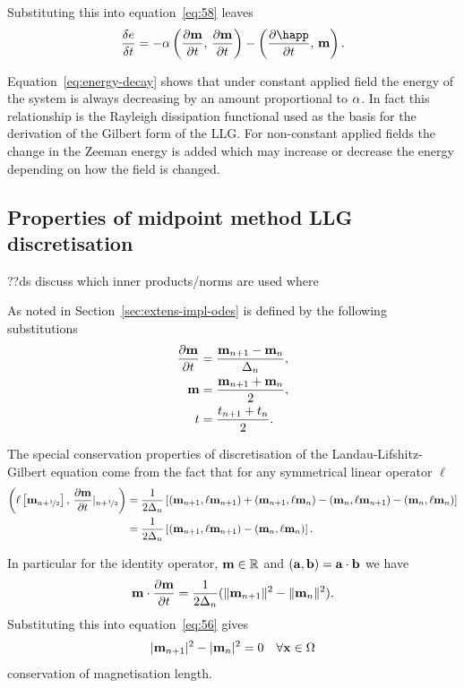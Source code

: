 Substituting this into equation~\eqref{eq:58} leaves
\begin{equation}
  \label{eq:energy-decay}
  \vd{\e}{t} = -\dampc \ip{\dmdt}{\dmdt} - \ip{\pd{\happ}{t}}{\mv}.
\end{equation}

Equation~\eqref{eq:energy-decay} shows that under constant applied field the energy of the system is always decreasing by an amount proportional to $\alpha$.
In fact this relationship is the Rayleigh dissipation functional used as the basis for the derivation of the Gilbert form of the LLG.\cite{Gilbert2004}
For non-constant applied fields the change in the Zeeman energy is added which may increase or decrease the energy depending on how the field is changed. %


\subsection{Properties of midpoint method LLG discretisation}
\label{sec:prop-midp-meth}

??ds discuss which inner products/norms are used where

As noted in Section~\ref{sec:extens-impl-odes} \imr is defined by the following substitutions
\begin{align}
  \label{eq:55}
  \frac{\partial \mathbf{m}}{\partial t} &= \frac{\mathbf{m}_{n+1} - \mathbf{m}_n}{\Delta_{n}}, \\
  \mathbf{m} &= \frac{\mathbf{m}_{n+1} + \mathbf{m}_n}{2}, \\
  t &=  \frac{t_{n+1} + t_n}{2}.
\end{align}

The special conservation properties of \imr discretisation of the Landau-Lifshitz-Gilbert equation come from the fact that for any symmetrical linear operator $\ell$
\begin{align}
  \label{eq:54}
  \left(\ell \left[ \mathbf{m}_{n+\nicefrac{1}{2}} \right],\,  \frac{\partial \mathbf{m}}{\partial t} \lvert_{n+\nicefrac{1}{2}} \right)
  &= \frac{1}{2\Delta_{n}} \left[
    (\mathbf{m}_{n+1} , \ell \mathbf{m}_{n+1})
    + (\mathbf{m}_{n+1} , \ell \mathbf{m}_{n})
    - (\mathbf{m}_{n} , \ell \mathbf{m}_{n+1})
    - (\mathbf{m}_{n} , \ell \mathbf{m}_{n})
    \right] \notag\\
  &= \frac{1}{2\Delta_{n}} \left[
    (\mathbf{m}_{n+1} , \ell \mathbf{m}_{n+1})
    - (\mathbf{m}_{n} , \ell \mathbf{m}_{n})
    \right].
\end{align}

In particular for the identity operator, $\mathbf{m} \in \mathbb{R}$ and $({\mathbf{a}}, {\mathbf{b}}) = {\mathbf{a}} \cdot {\mathbf{b}}$ we have
\begin{equation}
  \label{eq:52}
  \mathbf{m} \cdot \frac{\partial \mathbf{m}}{\partial t}  = \frac{1}{2\Delta_{n}} (\lVert \mathbf{m}_{n+1} \rVert^2 - \lVert \mathbf{m}_{n} \rVert^2 ).
\end{equation}
Substituting this into equation~\eqref{eq:56} gives
\begin{equation}
  \lvert \mathbf{m}_{n+1}  \rvert^2 - \lvert \mathbf{m}_{n} \rvert^2 = 0 \quad \forall \mathbf{x} \in \Omega
\end{equation}
\ie conservation of magnetisation length.

